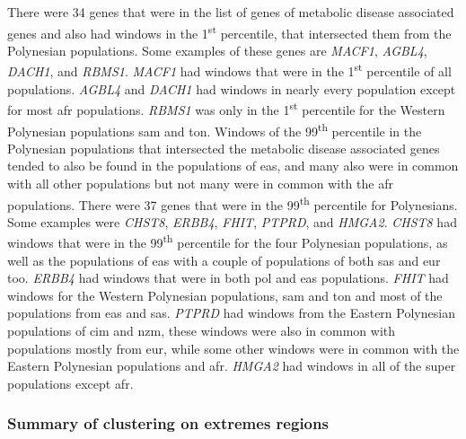 \documentclass[twoside,openright]{report}
\begin{document}
There were 34 genes that were in the list of genes of metabolic disease
associated genes and also had windows in the 1\textsuperscript{st}
percentile, that intersected them from the Polynesian populations. Some
examples of these genes are \emph{MACF1}, \emph{AGBL4}, \emph{DACH1},
and \emph{RBMS1}. \emph{MACF1} had windows that were in the
1\textsuperscript{st} percentile of all populations. \emph{AGBL4} and
\emph{DACH1} had windows in nearly every population except for most
\gls{afr} populations. \emph{RBMS1} was only in the
1\textsuperscript{st} percentile for the Western Polynesian populations
\gls{sam} and \gls{ton}. Windows of the 99\textsuperscript{th}
percentile in the Polynesian populations that intersected the metabolic
disease associated genes tended to also be found in the populations of
\gls{eas}, and many also were in common with all other populations but
not many were in common with the \gls{afr} populations. There were 37
genes that were in the 99\textsuperscript{th} percentile for
Polynesians. Some examples were \emph{CHST8}, \emph{ERBB4}, \emph{FHIT},
\emph{PTPRD}, and \emph{HMGA2}. \emph{CHST8} had windows that were in
the 99\textsuperscript{th} percentile for the four Polynesian
populations, as well as the populations of \gls{eas} with a couple of
populations of both \gls{sas} and \gls{eur} too. \emph{ERBB4} had
windows that were in both \gls{pol} and \gls{eas} populations.
\emph{FHIT} had windows for the Western Polynesian populations,
\gls{sam} and \gls{ton} and most of the populations from \gls{eas} and
\gls{sas}. \emph{PTPRD} had windows from the Eastern Polynesian
populations of \gls{cim} and \gls{nzm}, these windows were also in
common with populations mostly from \gls{eur}, while some other windows
were in common with the Eastern Polynesian populations and \gls{afr}.
\emph{HMGA2} had windows in all of the super populations except
\gls{afr}.

\subsubsection{Summary of clustering on extremes
regions}\label{summary-of-clustering-on-extremes-regions}
\end{document}
